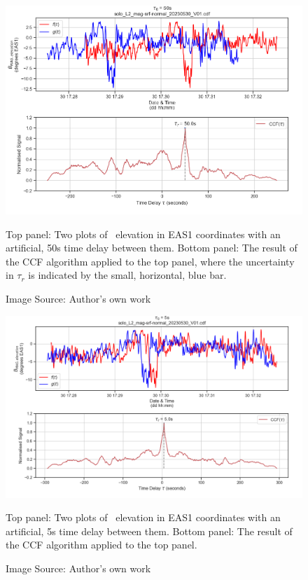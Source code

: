 \begin{figure}[h!]
    \centering
    \centerfloat
    \includegraphics[width=1.3\linewidth]{figures/artificial delay 50s.png}
    \caption{Top panel: Two  plots of \Beas\ elevation in EAS1 coordinates with an artificial, 50s time delay between them. Bottom panel: The result of the CCF algorithm applied to the top panel, where the uncertainty in \(\tau_r\) is indicated by the small, horizontal, blue bar.}
    \caption*{Image Source: Author's own work}
    \label{fig: arti 50s}
\end{figure}

\begin{figure}[h!]
    \centering
    \centerfloat
    \includegraphics[width=1.35\linewidth]{figures/artificial delay 5s.png}
    \caption{Top panel: Two  plots of \Beas\ elevation in EAS1 coordinates with an artificial, 5s time delay between them. Bottom panel: The result of the CCF algorithm applied to the top panel.}
    \caption*{Image Source: Author's own work}
    \label{fig: arti 5s}
\end{figure}